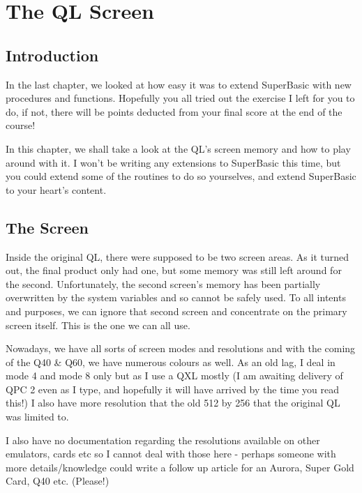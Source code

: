 \chapter{The QL Screen}

\section{Introduction}
\label{ch8-intro}%

In the last chapter, we looked at how easy it was to extend
    SuperBasic with new procedures and functions. Hopefully you all tried out
    the exercise I left for you to do, if not, there will be points deducted
    from your final score at the end of the course!

In this chapter, we shall take a look at the QL's screen memory and
    how to play around with it. I won't be writing any extensions to
    SuperBasic this time, but you could extend some of the routines to do so
    yourselves, and extend SuperBasic to your heart's content.

\section{The Screen}
\label{ch8-screen}%

Inside the original QL, there were supposed to be two screen areas.
    As it turned out, the final product only had one, but some memory was
    still left around for the second. Unfortunately, the second screen's
    memory has been partially overwritten by the system variables and so
    cannot be safely used. To all intents and purposes, we can ignore that
    second screen and concentrate on the primary screen itself. This is the
    one we can all use.

Nowadays, we have all sorts of screen modes and resolutions and with
    the coming of the Q40 \& Q60, we have numerous colours as well. As an
    old lag, I deal in mode 4 and mode 8 only but as I use a QXL mostly (I am
    awaiting delivery of QPC 2 even as I type, and hopefully it will have
    arrived by the time you read this!) I also have more resolution that the
    old 512 by 256 that the original QL was limited to.

I also have no documentation regarding the resolutions available on
    other emulators, cards etc so I cannot deal with those here -{} perhaps
    someone with more details/knowledge could write a follow up article for an
    Aurora, Super Gold Card, Q40 etc. (Please!)

